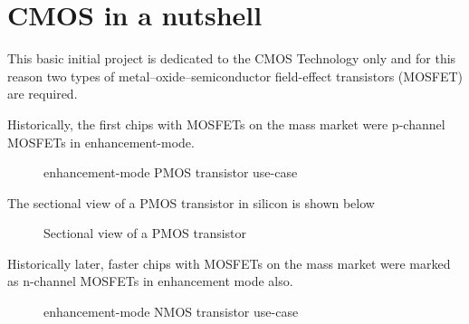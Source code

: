 \section{CMOS in a nutshell}\label{cmos_nutshell}
This basic initial project is dedicated to the CMOS Technology only and for this reason two types of metal–oxide–semiconductor field-effect transistors (MOSFET) are required.

Historically, the first chips with MOSFETs on the mass market were p-channel MOSFETs in enhancement-mode.

\begin{figure}[H]
	\centering
	\begin{circuitdiagram}{20}{20}
	\end{circuitdiagram}
	\caption{enhancement-mode PMOS transistor use-case}
\end{figure}

The sectional view of a PMOS transistor in silicon is shown below
\begin{figure}[H]
	\centering
	\begin{tikzpicture}[node distance = 3cm, auto, thick,scale=0.5, every node/.style={transform shape}]
		
	\end{tikzpicture}
	\caption{Sectional view of a PMOS transistor}
\end{figure}

Historically later, faster chips with MOSFETs on the mass market were marked as n-channel MOSFETs in enhancement mode also.

\begin{figure}[H]
	\centering
	\begin{circuitdiagram}{20}{20}
	\end{circuitdiagram}
	\caption{enhancement-mode NMOS transistor use-case}
\end{figure}

